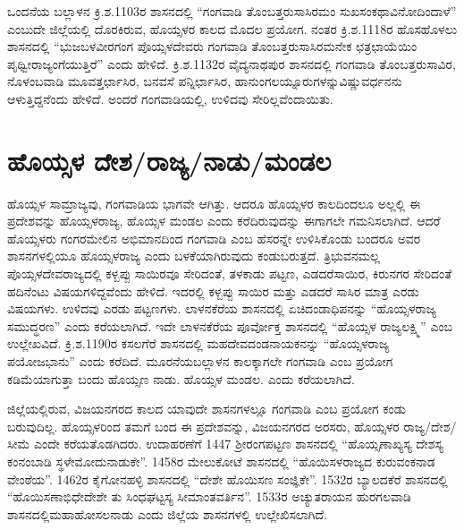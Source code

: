ಒಂದನೆಯ ಬಲ್ಲಾಳನ ಕ್ರಿ.ಶ.1103ರ ಶಾಸನದಲ್ಲಿ “ಗಂಗವಾಡಿ ತೊಂಬತ್ತರುಸಾಸಿರಮಂ ಸುಖಸಂಕಥಾ\break ವಿನೋದಿಂದಾಳೆ” ಎಂಬುದೇ ಜಿಲ್ಲೆಯಲ್ಲಿ ದೊರಕಿರುವ, ಹೊಯ್ಸಳರ ಕಾಲದ ಮೊದಲ ಪ್ರಯೋಗ. ನಂತರ ಕ್ರಿ.ಶ.1118ರ ಹೊಸಹೊಳಲು ಶಾಸನದಲ್ಲಿ “ಭುಜಬಳವೀರಗಂಗ ಪೊಯ್ಸಳದೇವರು ಗಂಗವಾಡಿ ತೊಂಬತ್ತರುಸಾಸಿರಮನೇಕ ಛತ್ರ\break ಛಾಯೆಯಿಂ ಪೃಥ್ವೀರಾಜ್ಯಂಗೆಯುತ್ತಿರೆ” ಎಂದು ಹೇಳಿದೆ. ಕ್ರಿ.ಶ.1132ರ ವೈದ್ಯನಾಥಪುರ ಶಾಸನದಲ್ಲಿ ಗಂಗವಾಡಿ ತೊಂಬತ್ತರುಸಾವಿರ, ನೊಳಂಬವಾಡಿ ಮೂವತ್ತರ್ಛಾಸಿರ, ಬನವಸೆ ಪನ್ನಿರ್ಛಾಸಿರ, ಹಾನುಂಗಲಯ್ನೂರುಗಳನ್ನು\break ವಿಷ್ಣುವರ್ಧನನು ಆಳುತ್ತಿದ್ದನೆಂದು ಹೇಳಿದೆ. ಅಂದರೆ ಗಂಗವಾಡಿಯಲ್ಲಿ, ಉಳಿದವು ಸೇರಿಲ್ಲವೆಂದಾಯಿತು.


\section{ಹೊಯ್ಸಳ ದೇಶ/ರಾಜ್ಯ/ನಾಡು/ಮಂಡಲ}

ಹೊಯ್ಸಳ ಸಾಮ್ರಾಜ್ಯವು, ಗಂಗವಾಡಿಯ ಭಾಗವೇ ಆಗಿತ್ತು. ಆದರೂ ಹೊಯ್ಸಳರ ಕಾಲದಿಂದಲೂ ಅಲ್ಲಲ್ಲಿ ಈ ಪ್ರದೇಶವನ್ನು ಹೊಯ್ಸಳರಾಜ್ಯ, ಹೊಯ್ಸಳ ಮಂಡಲ ಎಂದು ಕರೆದಿರುವುದನ್ನು ಈಗಾಗಲೇ ಗಮನಿಸಲಾಗಿದೆ. ಆದರೆ ಹೊಯ್ಸಳರು ಗಂಗರಮೇಲಿನ ಅಭಿಮಾನದಿಂದ ಗಂಗವಾಡಿ ಎಂಬ ಹೆಸರನ್ನೇ ಉಳಿಸಿಕೊಂಡು ಬಂದರೂ ಅವರ ಶಾಸನಗಳಲ್ಲಿಯೂ ಹೊಯ್ಸಳರಾಜ್ಯ ಎಂದು ಬಳಕೆಯಾಗಿರುವುದು ಕಂಡುಬರುತ್ತದೆ. ತ್ರಿಭುವನಮಲ್ಲ ಪೊಯ್ಸಳದೇವರಾಜ್ಯದಲ್ಲಿ ಕಳ್ಬಪ್ಪು ಸಾಯಿರವೂ ಸೇರಿದಂತೆ, ತಳಕಾಡು ಪಟ್ಟಣ, ಎಡದರೆಸಾಯಿರ, ಕಿರುನಗರ ಸೇರಿದಂತೆ ಹದಿನೆಂಟು ವಿಷಯಗಳಿದ್ದವೆಂದು ಹೇಳಿದೆ. ಇದರಲ್ಲಿ ಕಳ್ಬಪ್ಪು ಸಾಯಿರ ಮತ್ತು ಎಡದರೆ ಸಾಸಿರ ಮಾತ್ರ ಎರಡು ವಿಷಯಗಳು. ಉಳಿದವು ಎರಡು ಪಟ್ಟಣಗಳು. ಲಾಳನಕೆರೆಯ ಶಾಸನದಲ್ಲಿ ಏಚಿದಂಡಾಧಿಪನನ್ನು “ಹೊಯ್ಸಳರಾಜ್ಯ ಸಮುದ್ಧರಣ” ಎಂದು ಕರೆಯಲಾಗಿದೆ. ಇದೇ ಲಾಳನಕೆರೆಯ ಪೂರ್ವೋಕ್ತ ಶಾಸನದಲ್ಲಿ “ಹೊಯ್ಸಳ ರಾಜ್ಯಲಕ್ಷ್ಮಿ” ಎಂಬ ಉಲ್ಲೇಖವಿದೆ. ಕ್ರಿ.ಶ.1190ರ ಕಸಲಗೆರೆ ಶಾಸನದಲ್ಲಿ ಮಹದೇವದಂಡನಾಯಕನನ್ನು “ಹೊಯ್ಸಳರಾಜ್ಯ ಪಯೋಜಭಾನು” ಎಂದು ಕರೆದಿದೆ. ಮೂರನೆಯ\break ಬಲ್ಲಾಳನ ಕಾಲಕ್ಕಾಗಲೇ ಗಂಗವಾಡಿ ಎಂಬ ಪ್ರಯೋಗ ಕಡಿಮೆಯಾಗುತ್ತಾ ಬಂದು ಹೊಯ್ಸಣ ನಾಡು. ಹೊಯ್ಸಳ ಮಂಡಲ. ಎಂದು ಕರೆಯಲಾಗಿದೆ.

ಜಿಲ್ಲೆಯಲ್ಲಿರುವ, ವಿಜಯನಗರದ ಕಾಲದ ಯಾವುದೇ ಶಾಸನಗಳಲ್ಲೂ ಗಂಗವಾಡಿ ಎಂಬ ಪ್ರಯೋಗ ಕಂಡು ಬರುವುದಿಲ್ಲ. ಹೊಯ್ಸಳರಿಂದ ತಮಗೆ ಬಂದ ಈ ಪ್ರದೇಶವನ್ನು, ವಿಜಯನಗರದ ಅರಸರು, ಹೊಯ್ಸಳರ ರಾಜ್ಯ/ದೇಶ/ಸೀಮೆ ಎಂದೇ ಕರೆಯತೊಡಗಿದರು. ಉದಾಹರಣೆಗೆ 1447 ಶ‍್ರೀರಂಗಪಟ್ಟಣ ಶಾಸನದಲ್ಲಿ “ಹೊಯ್ಸಣಾಖ್ಯಸ್ಯ ದೇಶಸ್ಯ ಕಂನಂಬಾಡಿ ಸ್ಥಳೇ\break ಮೋದುನಾಡುಕೇ”. 1458ರ ಮೇಲುಕೋಟೆ ಶಾಸನದಲ್ಲಿ “ಹೊಯಿಸಳರಾಜ್ಯದ ಕುರುವಂಕನಾಡ ವೇಂಠೆಯ”. 1462ರ ಕೈಗೋನಹಳ್ಳಿ ಶಾಸನದಲ್ಲಿ “ದೇಶೇ ಹೊಯಿಸಣ ಸಂಜ್ಞಿಕೇ”. 1532ರ ಬ್ಯಾಲದಕೆರೆ ಶಾಸನದಲ್ಲಿ “ಹೊಯಿಸಣಾಭಿಧೇ\break ದೇಶೇ ತು ಸಿಂಧಘಟ್ಟಸ್ಯ ಸೀಮಾಂತವರ್ತಿನ”. 1533ರ ಅಚ್ಯುತರಾಯನ ಹುರಗಲವಾಡಿ ಶಾಸನದಲ್ಲಿ\break ಮಹಾಹೋಸಲನಾಡು ಎಂದು ಜಿಲ್ಲೆಯ ಶಾಸನಗಳಲ್ಲಿ ಉಲ್ಲೇಖಿಸಲಾಗಿದೆ.

